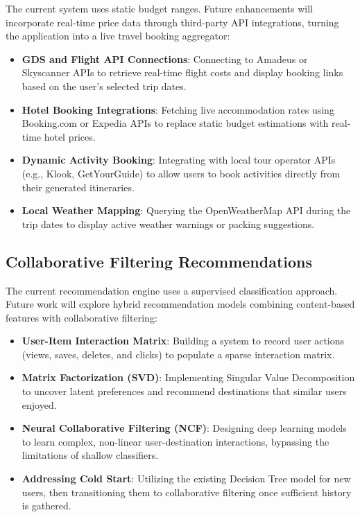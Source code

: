 The current system uses static budget ranges. Future enhancements will incorporate real-time price data through third-party API integrations, turning the application into a live travel booking aggregator:
\begin{itemize}
    \item \textbf{GDS and Flight API Connections}: Connecting to Amadeus or Skyscanner APIs to retrieve real-time flight costs and display booking links based on the user's selected trip dates.
    \item \textbf{Hotel Booking Integrations}: Fetching live accommodation rates using Booking.com or Expedia APIs to replace static budget estimations with real-time hotel prices.
    \item \textbf{Dynamic Activity Booking}: Integrating with local tour operator APIs (e.g., Klook, GetYourGuide) to allow users to book activities directly from their generated itineraries.
    \item \textbf{Local Weather Mapping}: Querying the OpenWeatherMap API during the trip dates to display active weather warnings or packing suggestions.
\end{itemize}

\subsection{Collaborative Filtering Recommendations}

The current recommendation engine uses a supervised classification approach. Future work will explore hybrid recommendation models combining content-based features with collaborative filtering:
\begin{itemize}
    \item \textbf{User-Item Interaction Matrix}: Building a system to record user actions (views, saves, deletes, and clicks) to populate a sparse interaction matrix.
    \item \textbf{Matrix Factorization (SVD)}: Implementing Singular Value Decomposition to uncover latent preferences and recommend destinations that similar users enjoyed.
    \item \textbf{Neural Collaborative Filtering (NCF)}: Designing deep learning models to learn complex, non-linear user-destination interactions, bypassing the limitations of shallow classifiers.
    \item \textbf{Addressing Cold Start}: Utilizing the existing Decision Tree model for new users, then transitioning them to collaborative filtering once sufficient history is gathered.
\end{itemize}

